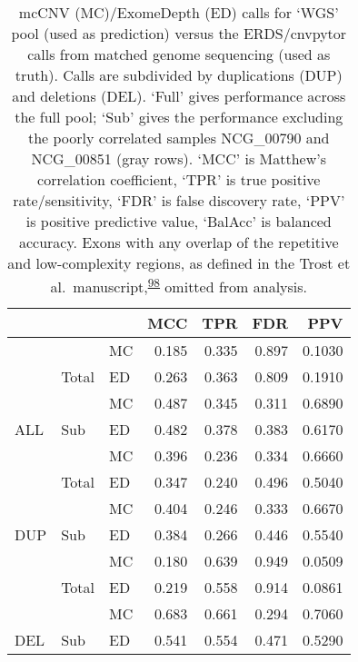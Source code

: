 \documentclass[11pt,letterpaper]{book}
\begin{document}
\begin{table}

\caption[mcCNV and ExomeDepth performance predicting calls from genome sequencing.]{\label{tab:predMet}mcCNV (MC)/ExomeDepth (ED) calls for `WGS' pool (used as prediction) versus the ERDS/cnvpytor calls from matched genome sequencing (used as truth). Calls are subdivided by duplications (DUP) and deletions (DEL). `Full' gives performance across the full pool; `Sub' gives the performance excluding the poorly correlated samples NCG\_00790 and NCG\_00851 (gray rows). `MCC' is Matthew's correlation coefficient, `TPR' is true positive rate/sensitivity, `FDR' is false discovery rate, `PPV' is positive predictive value, `BalAcc' is balanced accuracy. Exons with any overlap of the repetitive and low-complexity regions, as defined in the Trost et al.~manuscript,\textsuperscript{\protect\hyperlink{ref-trost:2018aa}{98}} omitted from analysis.}
\centering
\begin{tabular}[t]{lllrrrr}
\toprule
 &  &  & MCC & TPR & FDR & PPV\\
\midrule
 &  & MC & 0.185 & 0.335 & 0.897 & 0.1030\\
\cmidrule{3-7}
 & \multirow{-2}{*}{\raggedright\arraybackslash Total} & ED & 0.263 & 0.363 & 0.809 & 0.1910\\
\cmidrule{2-7}
 &  & MC & 0.487 & 0.345 & 0.311 & 0.6890\\
\cmidrule{3-7}
\multirow{-4}{*}{\raggedright\arraybackslash ALL} & \multirow{-2}{*}{\raggedright\arraybackslash Sub} & ED & 0.482 & 0.378 & 0.383 & 0.6170\\
\cmidrule{1-7}
 &  & MC & 0.396 & 0.236 & 0.334 & 0.6660\\
\cmidrule{3-7}
 & \multirow{-2}{*}{\raggedright\arraybackslash Total} & ED & 0.347 & 0.240 & 0.496 & 0.5040\\
\cmidrule{2-7}
 &  & MC & 0.404 & 0.246 & 0.333 & 0.6670\\
\cmidrule{3-7}
\multirow{-4}{*}{\raggedright\arraybackslash DUP} & \multirow{-2}{*}{\raggedright\arraybackslash Sub} & ED & 0.384 & 0.266 & 0.446 & 0.5540\\
\cmidrule{1-7}
 &  & MC & 0.180 & 0.639 & 0.949 & 0.0509\\
\cmidrule{3-7}
 & \multirow{-2}{*}{\raggedright\arraybackslash Total} & ED & 0.219 & 0.558 & 0.914 & 0.0861\\
\cmidrule{2-7}
 &  & MC & 0.683 & 0.661 & 0.294 & 0.7060\\
\cmidrule{3-7}
\multirow{-4}{*}{\raggedright\arraybackslash DEL} & \multirow{-2}{*}{\raggedright\arraybackslash Sub} & ED & 0.541 & 0.554 & 0.471 & 0.5290\\
\bottomrule
\end{tabular}
\end{table}
\end{document}
